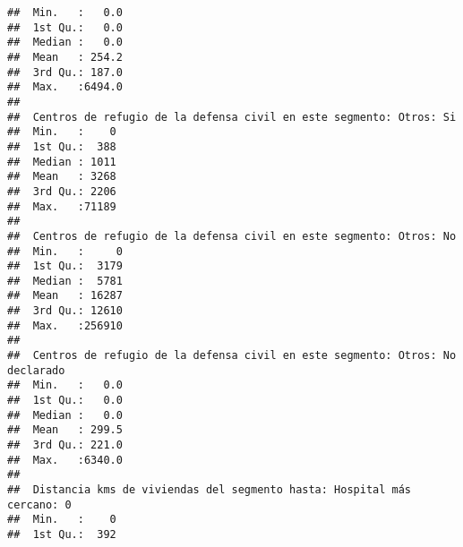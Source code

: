 \documentclass[11pt,]{article}
\begin{document}
\begin{verbatim}
##  Min.   :   0.0                                                                         
##  1st Qu.:   0.0                                                                         
##  Median :   0.0                                                                         
##  Mean   : 254.2                                                                         
##  3rd Qu.: 187.0                                                                         
##  Max.   :6494.0                                                                         
##                                                                                         
##  Centros de refugio de la defensa civil en este segmento: Otros: Si
##  Min.   :    0                                                     
##  1st Qu.:  388                                                     
##  Median : 1011                                                     
##  Mean   : 3268                                                     
##  3rd Qu.: 2206                                                     
##  Max.   :71189                                                     
##                                                                    
##  Centros de refugio de la defensa civil en este segmento: Otros: No
##  Min.   :     0                                                    
##  1st Qu.:  3179                                                    
##  Median :  5781                                                    
##  Mean   : 16287                                                    
##  3rd Qu.: 12610                                                    
##  Max.   :256910                                                    
##                                                                    
##  Centros de refugio de la defensa civil en este segmento: Otros: No declarado
##  Min.   :   0.0                                                              
##  1st Qu.:   0.0                                                              
##  Median :   0.0                                                              
##  Mean   : 299.5                                                              
##  3rd Qu.: 221.0                                                              
##  Max.   :6340.0                                                              
##                                                                              
##  Distancia kms de viviendas del segmento hasta: Hospital más cercano: 0
##  Min.   :    0                                                         
##  1st Qu.:  392                                                         

\end{verbatim}
\end{document}
